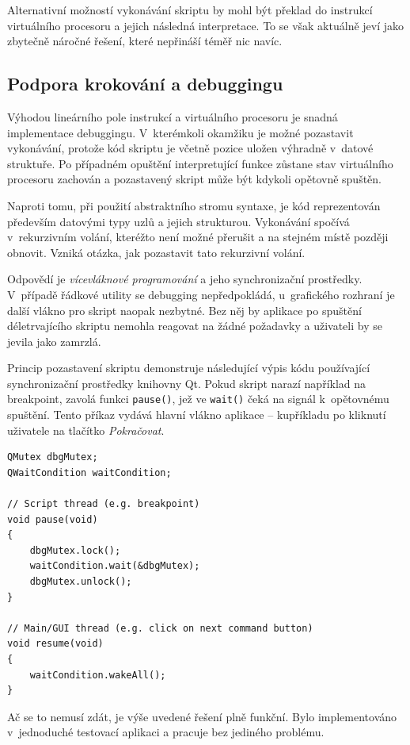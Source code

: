 \documentclass[11pt,twoside,a4paper]{book}
\begin{document}
Alternativní možností vykonávání skriptu by mohl být překlad do instrukcí virtuálního procesoru a jejich následná interpretace. To se však aktuálně jeví jako zbytečně náročné řešení, které nepřináší téměř nic navíc.


\subsection{Podpora krokování a debuggingu}
\label{podpora_debuggingu}

Výhodou lineárního pole instrukcí a virtuálního procesoru je snadná implementace de\-bug\-gin\-gu. V~kterémkoli okamžiku je možné pozastavit vykonávání, protože kód skriptu je včetně pozice uložen výhradně v~datové struktuře. Po případném opuštění interpretující funkce zůstane stav vir\-tu\-ál\-ní\-ho procesoru zachován a pozastavený skript může být kdykoli opětovně spuštěn.

Naproti tomu, při použití abstraktního stromu syntaxe, je kód reprezentován především datovými typy uzlů a jejich strukturou. Vykonávání spočívá v~rekurzivním volání, kteréžto není možné přerušit a na stejném místě později obnovit. Vzniká otázka, jak pozastavit tato rekurzivní volání.

Odpovědí je \textit{vícevláknové programování} a jeho synchronizační prostředky. V~případě řádkové utility se debugging nepředpokládá, u~grafického rozhraní je další vlákno pro skript naopak nezbytné. Bez něj by aplikace po spuštění déletrvajícího skriptu nemohla reagovat na žádné požadavky a uživateli by se jevila jako zamrzlá.

Princip pozastavení skriptu demonstruje následující výpis kódu používající synchronizační prostředky knihovny Qt. Pokud skript narazí například na breakpoint, zavolá funkci \texttt{pause()}, jež ve \texttt{wait()} čeká na signál k~opětovnému spuštění. Tento příkaz vydává hlavní vlákno aplikace -- kupříkladu po kliknutí uživatele na tlačítko \textit{Pokračovat}.

\begin{verbatim}
QMutex dbgMutex;
QWaitCondition waitCondition;

// Script thread (e.g. breakpoint)
void pause(void)
{
    dbgMutex.lock();
    waitCondition.wait(&dbgMutex);
    dbgMutex.unlock();
}

// Main/GUI thread (e.g. click on next command button)
void resume(void)
{
    waitCondition.wakeAll();
}
\end{verbatim}

Ač se to nemusí zdát, je výše uvedené řešení plně funkční. Bylo implementováno v~jednoduché testovací aplikaci a pracuje bez jediného problému.
\end{document}
